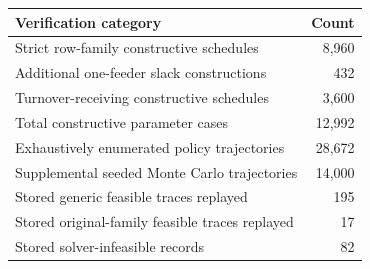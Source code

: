 \begin{center}\small
\begin{tabular}{lr}\toprule
Verification category&Count\\\midrule
Strict row-family constructive schedules&8,960\\
Additional one-feeder slack constructions&432\\
Turnover-receiving constructive schedules&3,600\\
Total constructive parameter cases&12,992\\
Exhaustively enumerated policy trajectories&28,672\\
Supplemental seeded Monte Carlo trajectories&14,000\\
Stored generic feasible traces replayed&195\\
Stored original-family feasible traces replayed&17\\
Stored solver-infeasible records&82\\
\bottomrule\end{tabular}\end{center}
